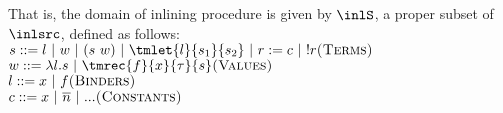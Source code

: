 That is, the domain of inlining procedure is given by $\inlS$, a proper subset of $\inlsrc$, defined as follows:\\
  $ s ::= l~|~w~|~(s~w) ~|~ \tmlet{l}{s_1}{s_2} ~|~ r:= c ~|~ !r \hfill \textsc{(Terms)}$ \\\indent 
  $ w ::= \lambda l. s ~|~ \tmrec{f}{x}{\tau}{s}\hfill \textsc{(Values)}$ \\\indent 
  $ l ::= x ~|~ f \hfill \textsc{(Binders)}$ \\\indent 
  $ c ::= x ~|~ \overline{n}~|~... \hfill \textsc{(Constants)}$\\[1em]


%

%
%	
% 	
% 	
% 	


